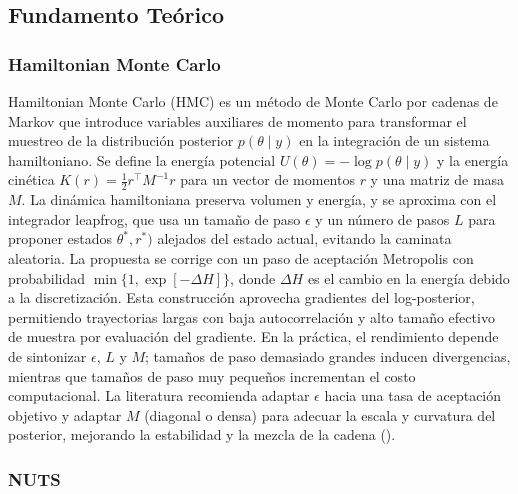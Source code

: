\documentclass[
]{article}
\begin{document}
\subsection{Fundamento Teórico}\label{fundamento-teuxf3rico}

\subsubsection{Hamiltonian Monte Carlo}\label{hamiltonian-monte-carlo}

Hamiltonian Monte Carlo (HMC) es un método de Monte Carlo por cadenas de
Markov que introduce variables auxiliares de momento para transformar el
muestreo de la distribución posterior \(p(\theta\mid y)\) en la
integración de un sistema hamiltoniano. Se define la energía potencial
\(U(\theta)=-\log p(\theta\mid y)\) y la energía cinética
\(K(r)=\tfrac12 r^\top M^{-1} r\) para un vector de momentos \(r\) y una
matriz de masa \(M\). La dinámica hamiltoniana preserva volumen y
energía, y se aproxima con el integrador leapfrog, que usa un tamaño de
paso \(\epsilon\) y un número de pasos \(L\) para proponer estados
\(\theta^*,r^*)\) alejados del estado actual, evitando la caminata
aleatoria. La propuesta se corrige con un paso de aceptación Metropolis
con probabilidad \(\min\{1,\exp[-\Delta H]\}\), donde \(\Delta H\) es el
cambio en la energía debido a la discretización. Esta construcción
aprovecha gradientes del log-posterior, permitiendo trayectorias largas
con baja autocorrelación y alto tamaño efectivo de muestra por
evaluación del gradiente. En la práctica, el rendimiento depende de
sintonizar \(\epsilon\), \(L\) y \(M\); tamaños de paso demasiado
grandes inducen divergencias, mientras que tamaños de paso muy pequeños
incrementan el costo computacional. La literatura recomienda adaptar
\(\epsilon\) hacia una tasa de aceptación objetivo y adaptar \(M\)
(diagonal o densa) para adecuar la escala y curvatura del posterior,
mejorando la estabilidad y la mezcla de la cadena
().

\subsubsection{NUTS}\label{nuts}
\end{document}
